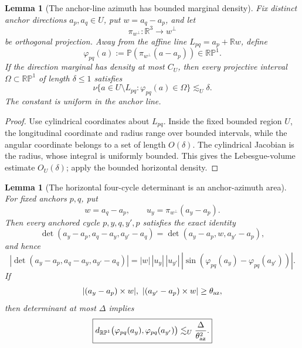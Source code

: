 \documentclass[10pt]{article}
\newtheorem{lemma}[theorem]{Lemma}
\begin{document}
\begin{lemma}[The anchor-line azimuth has bounded marginal density]
\label{lem:v070-anchor-azimuth-density}
Fix distinct anchor directions \(a_p,a_q\in U\), put \(w=a_q-a_p\), and let
\[
\pi_{w^\perp}:\mathbb R^3\longrightarrow w^\perp
\]
be orthogonal projection.  Away from the affine line
\(L_{pq}=a_p+\mathbb Rw\), define
\[
\varphi_{pq}(a)
:=
\mathbb P\!\left(\pi_{w^\perp}(a-a_p)\right)
\in\mathbb{RP}^1.
\]
If the direction marginal has density at most \(C_U\), then every projective interval
\(\Omega\subset\mathbb{RP}^1\) of length \(\delta\le1\) satisfies
\begin{equation}
\label{eq:v070-azimuth-marginal-density}
\boxed{
\nu\{a\in U\setminus L_{pq}:\varphi_{pq}(a)\in\Omega\}
\lesssim_U \delta.
}
\end{equation}
The constant is uniform in the anchor line.
\end{lemma}

\begin{proof}
Use cylindrical coordinates about \(L_{pq}\).  Inside the fixed bounded region \(U\), the
longitudinal coordinate and radius range over bounded intervals, while the angular coordinate
belongs to a set of length \(O(\delta)\).  The cylindrical Jacobian is the radius, whose integral
is uniformly bounded.  This gives the Lebesgue-volume estimate \(O_U(\delta)\); apply the bounded
horizontal density.
\end{proof}

\begin{lemma}[The horizontal four-cycle determinant is an anchor-azimuth area]
\label{lem:v070-determinant-azimuth-identity}
For fixed anchors \(p,q\), put
\[
w=a_q-a_p,\qquad
u_y=\pi_{w^\perp}(a_y-a_p).
\]
Then every anchored cycle \(p,y,q,y',p\) satisfies the exact identity
\begin{equation}
\label{eq:v070-determinant-azimuth-identity}
\boxed{
\det(a_y-a_p,a_q-a_y,a_{y'}-a_q)
=
\det(a_y-a_p,w,a_{y'}-a_p),
}
\end{equation}
and hence
\begin{equation}
\label{eq:v070-determinant-azimuth-area}
\boxed{
\left|
\det(a_y-a_p,a_q-a_y,a_{y'}-a_q)
\right|
=
|w|\,|u_y|\,|u_{y'}|\,
\left|\sin(\varphi_{pq}(a_y)-\varphi_{pq}(a_{y'}))\right|.
}
\end{equation}
If
\[
|(a_y-a_p)\times w|,
\ |(a_{y'}-a_p)\times w|
\ge\theta_{\rm az},
\]
then determinant at most \(\Delta\) implies
\begin{equation}
\label{eq:v070-azimuth-closeness}
\boxed{
d_{\mathbb{RP}^1}
\bigl(\varphi_{pq}(a_y),\varphi_{pq}(a_{y'})\bigr)
\lesssim_U
\frac{\Delta}{\theta_{\rm az}^2}.
}
\end{equation}
\end{lemma}
\end{document}
